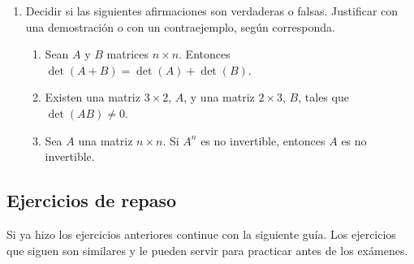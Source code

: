 \begin{enumerate}[topsep=6pt,itemsep=.4cm]
\item Decidir si las siguientes afirmaciones son verdaderas o falsas. Justificar con una demostración o con un contraejemplo, según corresponda.
    \begin{enumerate}
    \item Sean $A$ y $B$ matrices $n \times n$. Entonces $\det(A + B) = \det (A) + \det(B)$.
    \item Existen una matriz $3\times 2$, $A$, y una matriz $2\times 3$, $B$, tales que $\det(AB) \neq 0$.
    \item Sea $A$ una matriz $n\times n$. Si $A^n$ es no invertible, entonces $A$ es no invertible.
    \end{enumerate}

\end{enumerate}



\subsection*{Ejercicios de repaso}
Si ya hizo los ejercicios anteriores continue con la siguiente guía. Los ejercicios que siguen son similares y le pueden servir para practicar antes de los exámenes.


